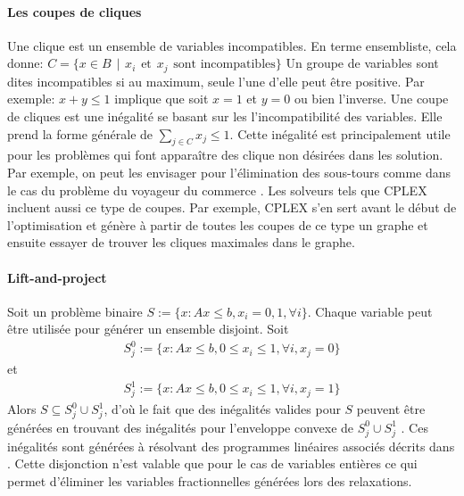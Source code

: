\documentclass[12pt,a4paper,oneside]{book}
\theoremstyle{definition}
\begin{document}
		\paragraph{Les coupes de cliques}
		Une clique est un ensemble de variables incompatibles. En terme ensembliste, cela donne:
		$C=\{x \in B \hspace{5pt}| \hspace{5pt} x_i  \hspace{5pt} \text{et}  \hspace{5pt} x_j  \hspace{5pt} \text{sont incompatibles}\}$
		Un groupe de variables sont dites incompatibles si au maximum, seule l'une d'elle peut être positive. Par exemple: $x+y \leq 1$ implique que soit $x=1$ et $y=0$ ou bien l'inverse. 
		Une coupe de cliques est une inégalité se basant sur les l'incompatibilité des variables. Elle prend la forme générale de $\sum_{j \in C} x_j \leq 1 $. Cette inégalité est principalement utile pour les problèmes qui font apparaître des clique non désirées dans les solution. Par exemple, on peut les envisager pour l'élimination des sous-tours comme dans le cas du problème du voyageur du commerce \cite{HERNANDEZPEREZ2004126}.
		Les solveurs tels que CPLEX incluent aussi ce type de coupes. Par exemple, CPLEX s'en sert avant le début de l'optimisation et génère à partir de toutes les coupes de ce type un graphe et ensuite essayer de trouver les cliques maximales dans le graphe.
		
		\paragraph{Lift-and-project}
	    Soit un problème binaire $S := \{ x: Ax \leq b, x_i = 0, 1, \forall i \}$.
		Chaque variable peut être utilisée pour générer un ensemble disjoint. Soit
        \begin{gather}
            S_j^0 := \{ x: Ax \leq b, 0 \leq x_i \leq 1, \forall i, x_j = 0 \}
        \end{gather}
         et
         \begin{gather}
             S_j^1 := \{ x: Ax \leq b, 0 \leq x_i \leq 1, \forall i, x_j = 1 \}
         \end{gather}
         Alors $S \subseteq S_j^0 \cup S_j^1$, d'où le fait que des inégalités valides pour $S$ peuvent être générées en trouvant des inégalités pour l'enveloppe convexe de $S_j^0 \cup S_j^1$ \cite{mitchellbranch}. Ces inégalités sont générées à résolvant des programmes linéaires associés décrits dans \cite{bonami2012optimizing}. Cette disjonction n'est valable que pour le cas de variables entières ce qui permet d'éliminer les variables fractionnelles générées lors des relaxations.
		
\end{document}
